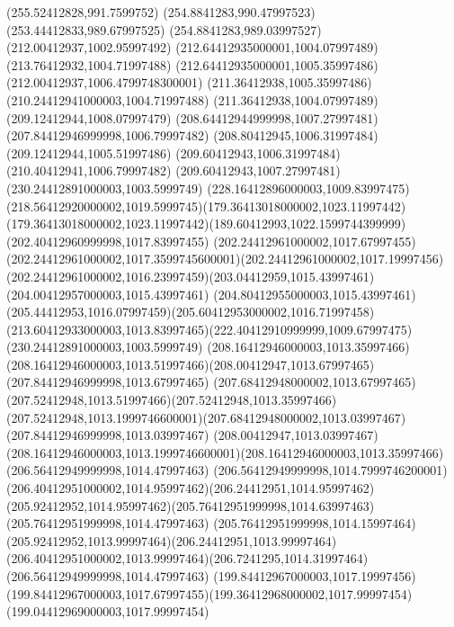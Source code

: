 {{	\lineto(255.52412828,991.7599752)
	\lineto(254.8841283,990.47997523)
	\lineto(253.44412833,989.67997525)
	\lineto(254.8841283,989.03997527)
	\closepath
	\moveto(212.00412937,1002.95997492)
	\lineto(212.64412935000001,1004.07997489)
	\lineto(213.76412932,1004.71997488)
	\lineto(212.64412935000001,1005.35997486)
	\lineto(212.00412937,1006.4799748300001)
	\lineto(211.36412938,1005.35997486)
	\lineto(210.24412941000003,1004.71997488)
	\lineto(211.36412938,1004.07997489)
	\closepath
	\moveto(209.12412944,1008.07997479)
	\lineto(208.64412944999998,1007.27997481)
	\lineto(207.84412946999998,1006.79997482)
	\lineto(208.80412945,1006.31997484)
	\lineto(209.12412944,1005.51997486)
	\lineto(209.60412943,1006.31997484)
	\lineto(210.40412941,1006.79997482)
	\lineto(209.60412943,1007.27997481)
	\closepath
	\moveto(230.24412891000003,1003.5999749)
	\curveto(228.16412896000003,1009.83997475)(218.56412920000002,1019.5999745)(179.36413018000002,1023.11997442)
	\curveto(179.36413018000002,1023.11997442)(189.60412993,1022.1599744399999)(202.40412960999998,1017.83997455)
	\curveto(202.24412961000002,1017.67997455)(202.24412961000002,1017.3599745600001)(202.24412961000002,1017.19997456)
	\curveto(202.24412961000002,1016.23997459)(203.04412959,1015.43997461)(204.00412957000003,1015.43997461)
	\curveto(204.80412955000003,1015.43997461)(205.44412953,1016.07997459)(205.60412953000002,1016.71997458)
	\curveto(213.60412933000003,1013.83997465)(222.40412910999999,1009.67997475)(230.24412891000003,1003.5999749)
	\closepath
	\moveto(208.16412946000003,1013.35997466)
	\curveto(208.16412946000003,1013.51997466)(208.00412947,1013.67997465)(207.84412946999998,1013.67997465)
	\curveto(207.68412948000002,1013.67997465)(207.52412948,1013.51997466)(207.52412948,1013.35997466)
	\curveto(207.52412948,1013.1999746600001)(207.68412948000002,1013.03997467)(207.84412946999998,1013.03997467)
	\curveto(208.00412947,1013.03997467)(208.16412946000003,1013.1999746600001)(208.16412946000003,1013.35997466)
	\closepath
	\moveto(206.56412949999998,1014.47997463)
	\curveto(206.56412949999998,1014.7999746200001)(206.40412951000002,1014.95997462)(206.24412951,1014.95997462)
	\curveto(205.92412952,1014.95997462)(205.76412951999998,1014.63997463)(205.76412951999998,1014.47997463)
	\curveto(205.76412951999998,1014.15997464)(205.92412952,1013.99997464)(206.24412951,1013.99997464)
	\curveto(206.40412951000002,1013.99997464)(206.7241295,1014.31997464)(206.56412949999998,1014.47997463)
	\closepath
	\moveto(199.84412967000003,1017.19997456)
	\curveto(199.84412967000003,1017.67997455)(199.36412968000002,1017.99997454)(199.04412969000003,1017.99997454)
}}
